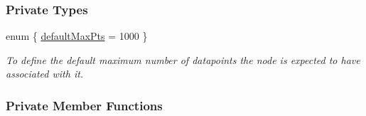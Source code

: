 \subsubsection*{\-Private \-Types}
\begin{DoxyCompactItemize}
\item 
enum \{ \hyperlink{classsubpavings_1_1SPSVnode_ae284ba2007e19bf4e2d546d6d844346aa0a41030519d8a235798dcc07a0c2948c}{default\-Max\-Pts} =  1000
 \}
\begin{DoxyCompactList}\small\item\em \-To define the default maximum number of datapoints the node is expected to have associated with it. \end{DoxyCompactList}\end{DoxyCompactItemize}
\subsubsection*{\-Private \-Member \-Functions}
